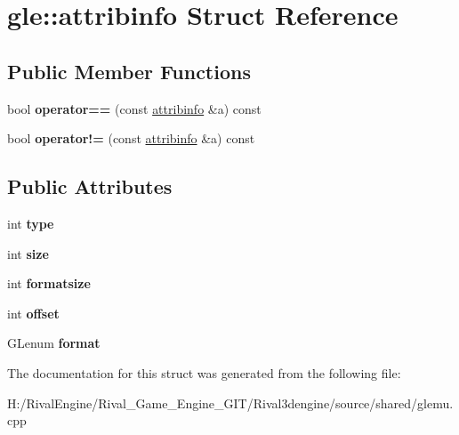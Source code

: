 \hypertarget{structgle_1_1attribinfo}{}\section{gle\+:\+:attribinfo Struct Reference}
\label{structgle_1_1attribinfo}
\subsection*{Public Member Functions}
\begin{DoxyCompactItemize}
\item 
\mbox{\label{structgle_1_1attribinfo_ad2e5764884167d66f6e3ad7f8808df41}} 
bool {\bfseries operator==} (const \hyperlink{structgle_1_1attribinfo}{attribinfo} \&a) const
\item 
\mbox{\label{structgle_1_1attribinfo_afc5234e29dc349cdfe22a255e4d47eaf}} 
bool {\bfseries operator!=} (const \hyperlink{structgle_1_1attribinfo}{attribinfo} \&a) const
\end{DoxyCompactItemize}
\subsection*{Public Attributes}
\begin{DoxyCompactItemize}
\item 
\mbox{\label{structgle_1_1attribinfo_ae727e71ec9e59a28e0f100563f134772}} 
int {\bfseries type}
\item 
\mbox{\label{structgle_1_1attribinfo_a2b2d947de0d24a39a795d125d1ec1f08}} 
int {\bfseries size}
\item 
\mbox{\label{structgle_1_1attribinfo_a73f5a7b6d6b0bd7e8db2e216bc95a858}} 
int {\bfseries formatsize}
\item 
\mbox{\label{structgle_1_1attribinfo_a8c48bc4a9f1e83b4f788faa298923750}} 
int {\bfseries offset}
\item 
\mbox{\label{structgle_1_1attribinfo_a5dd7f357de3c3831f78c3a261ded513f}} 
G\+Lenum {\bfseries format}
\end{DoxyCompactItemize}


The documentation for this struct was generated from the following file\+:\begin{DoxyCompactItemize}
\item 
H\+:/\+Rival\+Engine/\+Rival\+\_\+\+Game\+\_\+\+Engine\+\_\+\+G\+I\+T/\+Rival3dengine/source/shared/glemu.\+cpp\end{DoxyCompactItemize}
